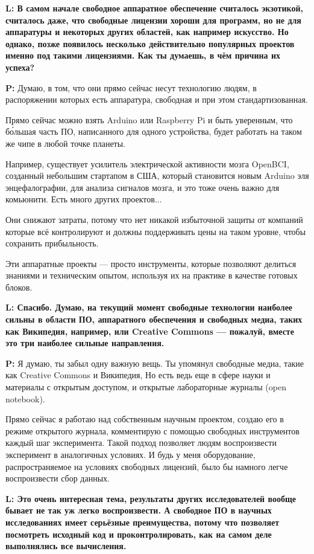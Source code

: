 \documentclass[10pt, a5paper]{article}
\begin{document}
\begin{Parallel}[p]{}{}
{{\noindent \bf L: В самом начале свободное аппаратное обеспечение считалось экзотикой, считалось даже, что свободные лицензии хороши для программ, но не для аппаратуры и некоторых других областей, как например искусство. Но однако, позже появилось несколько действительно популярных проектов именно под такими лицензиями. Как ты думаешь, в чём причина их успеха?}

{\noindent \bf P:} Думаю, в том, что они прямо сейчас несут технологию людям, в распоряжении которых есть аппаратура, свободная и при этом стандартизованная.

Прямо сейчас можно взять Arduino или Raspberry Pi и быть уверенным, что б\'{о}льшая часть ПО, написанного для одного устройства, будет работать на таком же чипе в любой точке планеты. 

Например, существует усилитель электрической активности мозга OpenBCI, созданный небольшим стартапом в США, который становится новым Arduino эля энцефалографии, для анализа сигналов мозга, и это тоже очень важно для комьюнити. Есть много других проектов...

Они снижают затраты, потому что нет никакой избыточной защиты от компаний которые всё контролируют и должны поддерживать цены на таком уровне, чтобы сохранить прибыльность. 

Эти аппаратные проекты --- просто инструменты, которые позволяют делиться знаниями и техническим опытом, используя их на практике в качестве готовых блоков.

{\noindent \bf L: Спасибо. 
Думаю, на текущий момент свободные технологии наиболее сильны в области ПО, аппаратного обеспечения и свободных медиа, таких как Википедия, например, или Creative Commons --- пожалуй, вместе это три наиболее сильные направления.}

{\noindent \bf P:} Я думаю, ты забыл одну важную вещь. Ты упомянул свободные медиа, такие как Creative Commons и Википедия, Но есть ведь еще в сфере науки и материалы с открытым доступом, и открытые лабораторные журналы (open notebook). 

Прямо сейчас я работаю над собственным научным проектом, создаю его в режиме открытого журнала, комментирую с помощью свободных инструментов каждый шаг эксперимента. Такой подход позволяет людям воспроизвести эксперимент в аналогичных условиях. И будь у меня оборудование, распространяемое на условиях свободных лицензий, было бы намного легче воспроизвести сбор данных.

{\noindent \bf L: Это очень интересная тема, результаты других исследователей вообще бывает не так уж легко воспроизвести.
А свободное ПО в научных исследованиях имеет серьёзные преимущества, потому что позволяет посмотреть исходный код и проконтролировать, как на самом деле выполнялись все вычисления.}

}
\end{Parallel}
\end{document}
